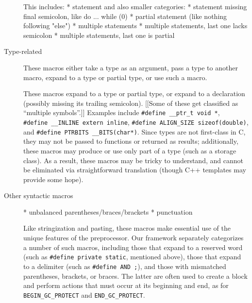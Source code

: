 \begin{description}
  This includes:
    * statement
  and also smaller categories:
    * statement missing final semicolon, like do {...} while (0)
    * partial statement (like nothing following "else")
    * multiple statements
    * multiple statements, last one lacks semicolon
    * multiple statements, last one is partial

\item[Type-related]  These macros either take a type as an argument, pass
  a type to another macro, expand to a type or partial type, or use such a
  macro.  

      These macros
      expand to a type or partial type, or expand to a
      declaration (possibly missing its trailing semicolon).  [[Some of these
      get classified as ``multiple symbols''.]]
      Examples include {\tt \#define \verb|__ptr_t| void *}, {\tt
      \#define \verb|__INLINE| extern inline}, {\tt \#define \verb|ALIGN_SIZE|
    sizeof(double)}, and {\tt \#define PTRBITS \verb|__BITS|(char*)}.  Since
    types are not first-class in C, they may not be passed to functions or
    returned as results; additionally, these macros may produce or use only
    part of a type (such as a storage class).  As a result, these macros may be
    tricky to understand, and cannot be eliminated via straightforward
    translation (though C++ templates may provide some hope).



\item[Other syntactic macros]  
  * unbalanced parentheses/braces/brackets
  * punctuation

  Like stringization and pasting, these
  macros make essential use of the unique features of the preprocessor.
  Our framework separately categorizes a number of such macros, including
  those that expand to a reserved word (such as {\tt \#define private
  static}, mentioned above), those that expand to a delimiter (such as
{\tt \#define AND ;}), and those with mismatched parentheses, brackets, or
braces.  The latter are often used to create a block and perform actions
that must occur at its beginning and end, as for \verb|BEGIN_GC_PROTECT|
and \verb|END_GC_PROTECT|.


\end{description}

